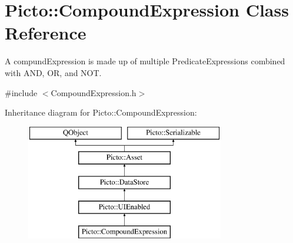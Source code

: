 \hypertarget{class_picto_1_1_compound_expression}{\section{Picto\-:\-:Compound\-Expression Class Reference}
\label{class_picto_1_1_compound_expression}
}


A compund\-Expression is made up of multiple Predicate\-Expressions combined with A\-N\-D, O\-R, and N\-O\-T.  




{\ttfamily \#include $<$Compound\-Expression.\-h$>$}

Inheritance diagram for Picto\-:\-:Compound\-Expression\-:\begin{figure}[H]
\begin{center}
\leavevmode
\includegraphics[height=5.000000cm]{class_picto_1_1_compound_expression}
\end{center}
\end{figure}

